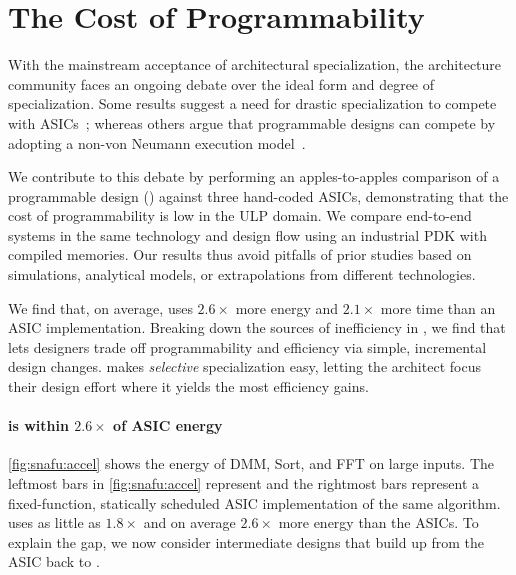 \section{The Cost of Programmability}
\label{snafu:case}
%
With the mainstream acceptance of architectural specialization,
the architecture community faces an ongoing debate over the ideal form and degree of specialization.
%
Some results suggest a need for drastic specialization to compete
with ASICs~\cite{hameed2010understanding,taylor2012dark,shao2014aladdin};
%
whereas others argue that programmable designs can compete by
adopting a non-von Neumann execution
model~\cite{nowatzki2016dsa,nowatzki2017domain}.

We contribute to this debate by performing an apples-to-apples
comparison of a programmable design (\snafuarch) against three hand-coded ASICs,
%
demonstrating that the cost of programmability is low in the ULP domain.
%
We compare end-to-end systems in the same technology and design flow
using an industrial PDK with compiled memories.
%
Our results thus avoid pitfalls of prior studies based on simulations,
analytical models, or extrapolations from different
technologies.

We find that, on average, \snafuarch uses $2.6\times$ more energy
and $2.1\times$ more time than an ASIC implementation.
%
Breaking down the sources of inefficiency in \snafuarch,
%
we find that \snafu lets designers trade off programmability and efficiency
via simple, incremental design changes.
%
\snafu makes {\em selective} specialization easy, letting the architect
focus their design effort where it yields the most efficiency gains.

\paragraph{\snafu is within $2.6\times$ of ASIC energy}
\autoref{fig:snafu:accel} shows the energy of DMM, Sort, and FFT on large inputs.
%
The leftmost bars in \autoref{fig:snafu:accel} represent \snafuarch and the rightmost bars %
represent a fixed-function, statically scheduled ASIC implementation of the same algorithm.
% 
\snafuarch uses as little as $1.8\times$ and on average $2.6\times$ more energy than the ASICs.
%
To explain the gap,
we now consider intermediate designs that build up from the ASIC back to \snafuarch.

